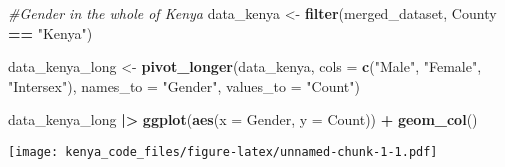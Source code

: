 \documentclass[
]{article}
\newenvironment{Shaded}{\begin{snugshade}}{\end{snugshade}}
\newcommand{\AttributeTok}[1]{\textcolor[rgb]{0.13,0.29,0.53}{#1}}
\newcommand{\CommentTok}[1]{\textcolor[rgb]{0.56,0.35,0.01}{\textit{#1}}}
\newcommand{\FunctionTok}[1]{\textcolor[rgb]{0.13,0.29,0.53}{\textbf{#1}}}
\newcommand{\NormalTok}[1]{#1}
\newcommand{\OtherTok}[1]{\textcolor[rgb]{0.56,0.35,0.01}{#1}}
\newcommand{\SpecialCharTok}[1]{\textcolor[rgb]{0.81,0.36,0.00}{\textbf{#1}}}
\newcommand{\StringTok}[1]{\textcolor[rgb]{0.31,0.60,0.02}{#1}}
\begin{document}
\begin{Shaded}
\begin{Highlighting}[]
\CommentTok{\#Gender in the whole of Kenya}
\NormalTok{data\_kenya }\OtherTok{\textless{}{-}} \FunctionTok{filter}\NormalTok{(merged\_dataset, County }\SpecialCharTok{==} \StringTok{"Kenya"}\NormalTok{)}

\NormalTok{data\_kenya\_long }\OtherTok{\textless{}{-}} \FunctionTok{pivot\_longer}\NormalTok{(data\_kenya, }\AttributeTok{cols =} \FunctionTok{c}\NormalTok{(}\StringTok{"Male"}\NormalTok{, }\StringTok{"Female"}\NormalTok{, }\StringTok{"Intersex"}\NormalTok{), }\AttributeTok{names\_to =} \StringTok{"Gender"}\NormalTok{, }\AttributeTok{values\_to =} \StringTok{"Count"}\NormalTok{)}

\NormalTok{data\_kenya\_long }\SpecialCharTok{|\textgreater{}} 
  \FunctionTok{ggplot}\NormalTok{(}\FunctionTok{aes}\NormalTok{(}\AttributeTok{x =}\NormalTok{ Gender, }\AttributeTok{y =}\NormalTok{ Count)) }\SpecialCharTok{+}
  \FunctionTok{geom\_col}\NormalTok{()}
\end{Highlighting}
\end{Shaded}

\texttt{[image: kenya\_code\_files/figure-latex/unnamed-chunk-1-1.pdf]}
\end{document}
